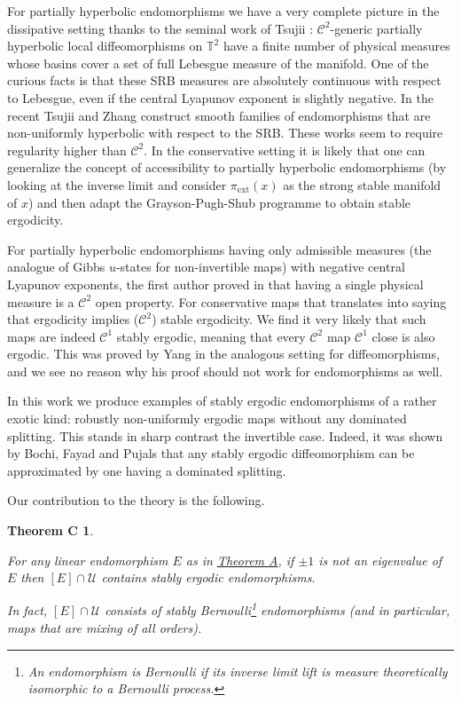 \documentclass[11pt,letterpaper,reqno]{article}
\newtheorem*{theoremC}{Theorem C}
\newcommand{\TT}{\mathbb{T}^2}
\newcommand{\pext}{\pi_{\mathrm{ext}}}
\begin{document}
For partially hyperbolic endomorphisms we have a very complete picture in the dissipative setting thanks to the seminal work of Tsujii \cite{Tsujii2005}: $\mathcal C^2$-generic partially hyperbolic local diffeomorphisms on $\TT$ have a finite number of physical measures whose basins cover a set of full Lebesgue measure of the manifold. One of the curious facts is that these SRB measures are absolutely continuous with respect to Lebesgue, even if the central Lyapunov exponent is slightly negative. In the recent \cite{Tsujii2022} Tsujii and Zhang construct smooth families of endomorphisms that are non-uniformly hyperbolic with respect to the SRB.  These works seem to require regularity higher than $\mathcal C^2$. In the conservative setting it is likely that one can generalize the concept of accessibility to partially hyperbolic endomorphisms (by looking at the inverse limit and consider $\pext(x)$ as the strong stable manifold of $x$) and then adapt the Grayson-Pugh-Shub programme to obtain stable ergodicity.

For partially hyperbolic endomorphisms having only admissible measures (the analogue of Gibbs $u$-states for non-invertible maps) with negative central Lyapunov exponents, the first author proved in \cite{Andersson2010} that having a single physical measure is a $\mathcal C^2$ open property. For conservative maps that translates into saying that ergodicity implies ($\mathcal C^2$) stable ergodicity. We find it very likely that such maps are indeed $\mathcal C^1$ stably ergodic, meaning that every $\mathcal C^2$ map $\mathcal C^1$ close is also ergodic. This was proved by Yang \cite{Yang2021} in the analogous setting for diffeomorphisms, and we see no reason why his proof should not work for endomorphisms as well. 

In this work we produce examples of stably ergodic endomorphisms of a rather exotic kind: robustly non-uniformly ergodic maps without any dominated splitting. This stands in sharp contrast the invertible case. Indeed, it was shown by Bochi, Fayad and Pujals \cite{BoFaPu2006} that any stably ergodic diffeomorphism can be approximated by one having a dominated splitting.

Our contribution to the theory is the following.


\begin{theoremC}\hypertarget{theoremC}{}
For any linear endomorphism $E$ as in \hyperlink{theoremA}{Theorem A}, if $\pm 1$ is not an eigenvalue of $E$ then 
$[E]\cap \mathcal U$ contains stably ergodic endomorphisms.

In fact, $[E]\cap \mathcal U$ consists of stably Bernoulli\footnote{An endomorphism is Bernoulli if its inverse limit lift is measure theoretically isomorphic to a Bernoulli process.} endomorphisms (and in particular, maps that are mixing of all orders).
\end{theoremC}
\end{document}
